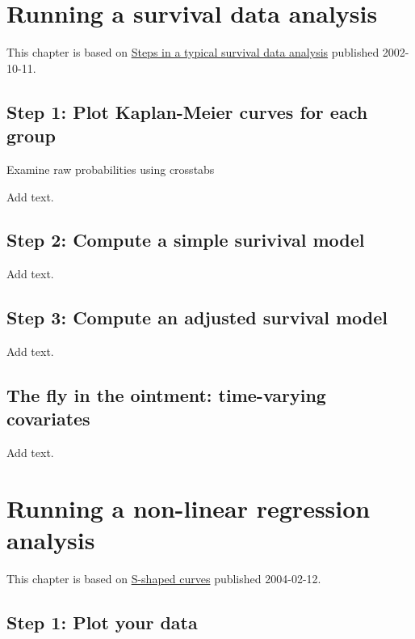 \documentclass[
  letterpaper,
  DIV=11,
  numbers=noendperiod]{scrreprt}
\begin{document}

\chapter{Running a survival data
analysis}\label{running-a-survival-data-analysis}

This chapter is based on
\href{http://www.new.pmean.com/steps-in-survival-analysis/}{Steps in a
typical survival data analysis} published 2002-10-11.

\section{Step 1: Plot Kaplan-Meier curves for each
group}\label{step-1-plot-kaplan-meier-curves-for-each-group}

Examine raw probabilities using crosstabs

Add text.

\section{Step 2: Compute a simple surivival
model}\label{step-2-compute-a-simple-surivival-model}

Add text.

\section{Step 3: Compute an adjusted survival
model}\label{step-3-compute-an-adjusted-survival-model}

Add text.

\section{The fly in the ointment: time-varying
covariates}\label{the-fly-in-the-ointment-time-varying-covariates}

Add text.


\chapter{Running a non-linear regression
analysis}\label{running-a-non-linear-regression-analysis}

This chapter is based on
\href{http://new.pmean.com/fitting-s-shaped-curves/}{S-shaped curves}
published 2004-02-12.

\section{Step 1: Plot your data}\label{step-1-plot-your-data-1}
\end{document}
